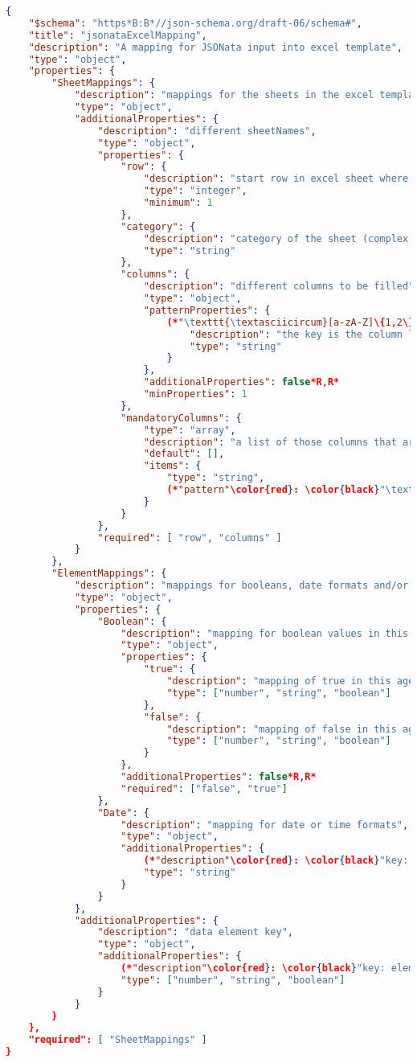 \begin{mdframed}[backgroundcolor=mygrey2, leftmargin=0.5cm, hidealllines=true, innerleftmargin=3pt, innerrightmargin=0cm, innertopmargin=0cm, innerbottommargin=-3cm, splitbottomskip=0]
\begin{lstlisting}[language=json, caption={JSON-Schema für die Mapping-Datei}, label=code:schema]
{
	"$schema": "https*B:B*//json-schema.org/draft-06/schema#",
	"title": "jsonataExcelMapping",
	"description": "A mapping for JSONata input into excel template",
	"type": "object",
	"properties": {
		"SheetMappings": {
			"description": "mappings for the sheets in the excel template",
			"type": "object",
			"additionalProperties": {
				"description": "different sheetNames",
				"type": "object",
				"properties": {
					"row": {
						"description": "start row in excel sheet where the device data shall be written",
		 				"type": "integer",
		 				"minimum": 1
					},
					"category": {
						"description": "category of the sheet (complex data element key)",
						"type": "string"
					},
					"columns": {
						"description": "different columns to be filled",
						"type": "object",
						"patternProperties": {
							(*"\texttt{\textasciicircum}[a-zA-Z]\{1,2\}\$"*): {
								"description": "the key is the column letter in excel format, the value is the JSONata expression to filter the right device data for this column",
								"type": "string"
							}
						},
						"additionalProperties": false*R,R*
						"minProperties": 1
					},
					"mandatoryColumns": {
						"type": "array",
						"description": "a list of those columns that are required to be filled",
						"default": [],
						"items": {
							"type": "string",
							(*"pattern"\color{red}: \color{black}"\texttt{\textasciicircum}[a-zA-Z]\{1,2\}\$"*)
						}
					}
				},
				"required": [ "row", "columns" ]
			}
		},
		"ElementMappings": {
			"description": "mappings for booleans, date formats and/or specific data elements",
			"type": "object",
			"properties": {
				"Boolean": {
					"description": "mapping for boolean values in this template",
		 			"type": "object",
					"properties": {
						"true": {
							"description": "mapping of true in this agency",
							"type": ["number", "string", "boolean"]
						},
						"false": {
							"description": "mapping of false in this agency",
							"type": ["number", "string", "boolean"]
						}
					},
					"additionalProperties": false*R,R*
					"required": ["false", "true"]
				},
				"Date": {
					"description": "mapping for date or time formats",
					"type": "object",
					"additionalProperties": {
						(*"description"\color{red}: \color{black}"key: date format for \xblackout{p36} / value: date format in excel for agency*)",
						"type": "string"
					} 
				}
			},
			"additionalProperties": {
				"description": "data element key",
				"type": "object",
				"additionalProperties": {
					(*"description"\color{red}: \color{black}"key: element value for \xblackout{p36} / value: element value for agency*)",
					"type": ["number", "string", "boolean"]
				}
			}	
		}
	},
	"required": [ "SheetMappings" ]
}
\end{lstlisting}
\end{mdframed}
